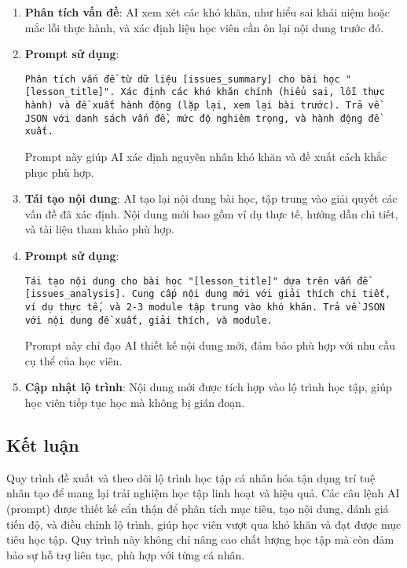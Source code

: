 \begin{enumerate}
	\item \textbf{Phân tích vấn đề}: AI xem xét các khó khăn, như hiểu sai khái niệm hoặc mắc lỗi thực hành, và xác định liệu học viên cần ôn lại nội dung trước đó.

	\item \textbf{Prompt sử dụng}:
	      \begin{Verbatim}[breaklines=true]
		      Phân tích vấn đề từ dữ liệu [issues_summary] cho bài học "[lesson_title]". Xác định các khó khăn chính (hiểu sai, lỗi thực hành) và đề xuất hành động (lặp lại, xem lại bài trước). Trả về JSON với danh sách vấn đề, mức độ nghiêm trọng, và hành động đề xuất.
	      \end{Verbatim}
	      Prompt này giúp AI xác định nguyên nhân khó khăn và đề xuất cách khắc phục phù hợp.

	\item \textbf{Tái tạo nội dung}: AI tạo lại nội dung bài học, tập trung vào giải quyết các vấn đề đã xác định. Nội dung mới bao gồm ví dụ thực tế, hướng dẫn chi tiết, và tài liệu tham khảo phù hợp.

	\item \textbf{Prompt sử dụng}:
	      \begin{Verbatim}[breaklines=true]
		      Tái tạo nội dung cho bài học "[lesson_title]" dựa trên vấn đề [issues_analysis]. Cung cấp nội dung mới với giải thích chi tiết, ví dụ thực tế, và 2-3 module tập trung vào khó khăn. Trả về JSON với nội dung đề xuất, giải thích, và module.
	      \end{Verbatim}
	      Prompt này chỉ đạo AI thiết kế nội dung mới, đảm bảo phù hợp với nhu cầu cụ thể của học viên.

	\item \textbf{Cập nhật lộ trình}: Nội dung mới được tích hợp vào lộ trình học tập, giúp học viên tiếp tục học mà không bị gián đoạn.
\end{enumerate}

\subsection{Kết luận}
Quy trình đề xuất và theo dõi lộ trình học tập cá nhân hóa tận dụng trí tuệ nhân tạo để mang lại trải nghiệm học tập linh hoạt và hiệu quả. Các câu lệnh AI (prompt) được thiết kế cẩn thận để phân tích mục tiêu, tạo nội dung, đánh giá tiến độ, và điều chỉnh lộ trình, giúp học viên vượt qua khó khăn và đạt được mục tiêu học tập. Quy trình này không chỉ nâng cao chất lượng học tập mà còn đảm bảo sự hỗ trợ liên tục, phù hợp với từng cá nhân.
